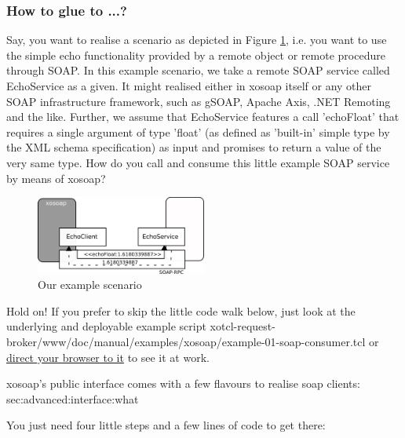   \subsubsection{How to glue to ...?}\label{sec:xosoap:quickstart:glueto}
  Say, you want to realise a scenario as depicted in Figure \ref{fig:quickstart:xosoap:1}, i.e. you want to 
use the simple echo functionality provided by a remote object or remote procedure through SOAP. In this 
example scenario, we take a remote SOAP service called EchoService as a given. It might realised 
either in xosoap itself or any other SOAP infrastructure framework, such as gSOAP, Apache Axis, .NET 
Remoting and the like. Further, we assume that  EchoService features a call 'echoFloat' that requires a 
single argument of type 'float' (as defined as 'built-in' simple type by the XML schema specification) as 
input and promises to return a value of the very same type. How do you call and consume this little 
example SOAP service by means of xosoap?
\begin{figure}[htbp]
\begin{center}
\includegraphics[width=0.5\textwidth]{img/consumer.png}
\caption{Our example scenario}
\label{fig:quickstart:xosoap:1}
\end{center}
\end{figure}
\begin{hints}
\item Hold on! If you prefer to skip the little code walk below, just look at the underlying and deployable 
example script xotcl-request-broker/www/doc/manual/examples/xosoap/example-01-soap-consumer.tcl 
or \href{http://openacs-dotlrn.wu-wien.ac.at/request-broker/doc/manual/examples/xosoap/example-01-
soap-consumer.tcl}{direct your browser to it} to see it at work.
\item xosoap's public interface comes with a few flavours to realise soap clients: \nameref
{sec:advanced:interface:what}
\end{hints}
You just need four little steps and a few lines of code to get there:
